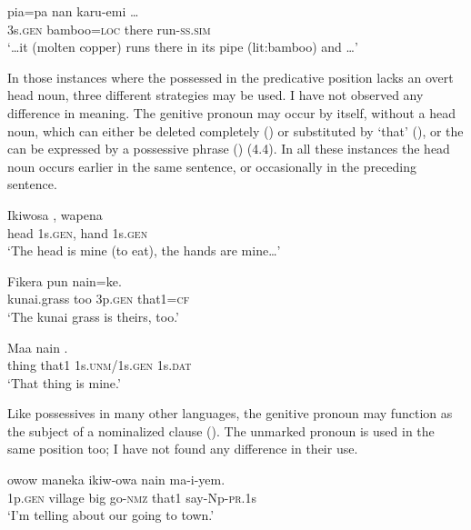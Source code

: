 \ea%
\label{ex:x1808}
\gll {\dots} pia=pa nan karu-emi {\dots} \\
3s.\textsc{gen} bamboo=\textsc{loc} there run-\textsc{ss}.\textsc{sim} \\
\glt`{\dots}it (molten copper) runs there in its pipe (lit:bamboo) and {\dots}'
\z

In those instances where the possessed  in the predicative position lacks an overt head noun, three different strategies may be used. I have not observed any difference in meaning. The genitive pronoun may occur by itself, without a head noun, which can either be deleted completely () or substituted by  `that' (), or the  can be expressed by a possessive phrase () (4.4). In all these instances the head noun occurs earlier in the same sentence, or occasionally in the preceding sentence. 

\ea%
\label{ex:x576}
\gll Ikiwosa , wapena  \\
head 1s.\textsc{gen}, hand 1s.\textsc{gen}\\
\glt`The head is mine (to eat), the hands are mine{\dots}'
\z

\ea%
\label{ex:x577}
\gll Fikera pun  nain=ke. \\
kunai.grass too 3p.\textsc{gen} that1=\textsc{cf}\\
\glt`The kunai grass is theirs, too.'
\z

\ea%
\label{ex:x578}
\gll Maa nain  . \\
thing that1 1s.\textsc{unm}/1s.\textsc{gen} 1s.\textsc{dat}\\
\glt`That thing is mine.'
\z

Like possessives in many other languages, the genitive pronoun may function as the subject of a nominalized clause (). The unmarked pronoun is used in the same position too; I have not found any difference in their use.

\ea%
\label{ex:x571}
\gll {} owow maneka ikiw-owa nain ma-i-yem. \\
1p.\textsc{gen} village big go-\textsc{nmz} that1 say-Np-\textsc{pr}.1s\\
\glt`I'm telling about our going to town.'
\z

